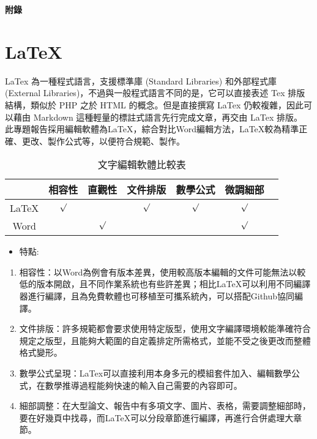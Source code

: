\begin{appendix}
\renewcommand{\thesection}{\bf 附錄 \Alph{section}}%
\begin{center}
\fontsize{20pt}{0em}\selectfont\bf 附錄
\end{center}
\section*{LaTeX}
LaTex 為一種程式語言，支援標準庫 (Standard Libraries) 和外部程式庫 (External Libraries)，不過與一般程式語言不同的是，它可以直接表述 Tex 排版結構，類似於 PHP 之於 HTML 的概念。但是直接撰寫 LaTex 仍較複雜，因此可以藉由 Markdown 這種輕量的標註式語言先行完成文章，再交由 LaTex 排版。
此專題報告採用編輯軟體為LaTeX，綜合對比Word編輯方法，LaTeX較為精準正確、更改、製作公式等，以便符合規範、製作。
 \begin{table}[htbp] %
			\centering%
			\caption{文字編輯軟體比較表}%
			\large%
			\label{tab_文字編輯軟體比較表:scale}
			\begin{tabular}{|c|c|c|c|c|c|c|}
			\hline
			\diagbox[width=5em]& 相容性 & 直觀性 & 文件排版 & 數學公式 & 微調細部\\ 
			\hline
			LaTeX 		&$\surd$&		&$\surd$&$\surd$&$\surd$\\
			\hline
			Word	 	&		&$\surd$&		&		&$\surd$\\
			\hline
			
			\end{tabular}
		\end{table}	
\end{appendix}
\begin{itemize} 
\item 特點:
\end{itemize}
\begin{enumerate}
\item 相容性：以Word為例會有版本差異，使用較高版本編輯的文件可能無法以較低的版本開啟，且不同作業系統也有些許差異；相比LaTeX可以利用不同編譯器進行編譯，且為免費軟體也可移植至可攜系統內，可以搭配Github協同編譯。
\item 文件排版：許多規範都會要求使用特定版型，使用文字編譯環境較能準確符合規定之版型，且能夠大範圍的自定義排定所需格式，並能不受之後更改而整體格式變形。
\item 數學公式呈現：LaTex可以直接利用本身多元的模組套件加入、編輯數學公式，在數學推導過程能夠快速的輸入自己需要的內容即可。
\item 細部調整：在大型論文、報告中有多項文字、圖片、表格，需要調整細部時，要在好幾頁中找尋，而LaTeX可以分段章節進行編譯，再進行合併處理大章節。
\end{enumerate}
\newpage

